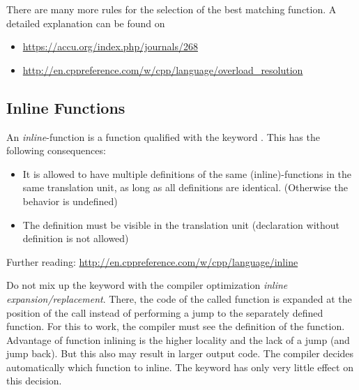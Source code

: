 \begin{rem}
  There are many more rules for the selection of the best matching function. A detailed explanation can be found on
  \begin{itemize}
	  \item \url{https://accu.org/index.php/journals/268}
	  \item \url{http://en.cppreference.com/w/cpp/language/overload_resolution}
  \end{itemize}
\end{rem}


\subsection{Inline Functions\label{sec:inline-function}}
An \emph{inline}-function is a function qualified with the keyword . This has the following consequences:
\begin{itemize}
  \item It is allowed to have multiple definitions of the same (inline)-functions in the same translation unit, as long as all definitions are identical.
        (Otherwise the behavior is undefined)
  \item The definition must be visible in the translation unit (declaration without definition is not allowed)
\end{itemize}
Further reading: \url{http://en.cppreference.com/w/cpp/language/inline}

Do not mix up the keyword  with the compiler optimization \emph{inline expansion/replacement}. There, the code of the called function is
expanded at the position of the call instead of performing a jump to the separately defined function. For this to work, the compiler must see the
definition of the function. Advantage of function inlining is the higher locality and the lack of a jump (and jump back). But this also may result in
larger output code. The compiler decides automatically which function to inline. The keyword  has only very little effect on this decision.
